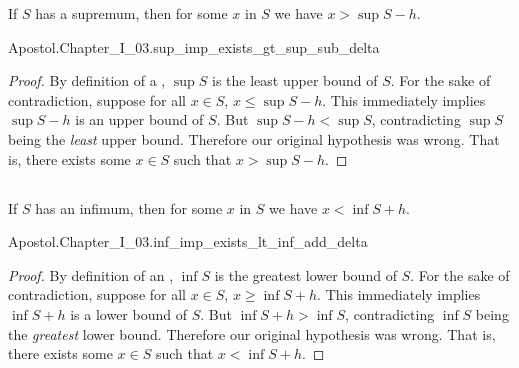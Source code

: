 \documentclass{report}
\begin{document}
  \begin{theorem}[I.32a]
    If $S$ has a supremum, then for some $x$ in $S$ we have $x > \sup{S} - h$.
  \end{theorem}

    {Apostol.Chapter\_I\_03.sup\_imp\_exists\_gt\_sup\_sub\_delta}

  \begin{proof}
    By definition of a , $\sup{S}$ is the least upper
      bound of $S$.
    For the sake of contradiction, suppose for all $x \in S$,
      $x \leq \sup{S} - h$.
    This immediately implies $\sup{S} - h$ is an upper bound of $S$.
    But $\sup{S} - h < \sup{S}$, contradicting $\sup{S}$ being the
      \textit{least} upper bound.
    Therefore our original hypothesis was wrong.
    That is, there exists some $x \in S$ such that $x > \sup{S} - h$.
  \end{proof}

\subsection{}%

  \begin{theorem}[I.32b]
    If $S$ has an infimum, then for some $x$ in $S$ we have $x < \inf{S} + h$.
  \end{theorem}

    {Apostol.Chapter\_I\_03.inf\_imp\_exists\_lt\_inf\_add\_delta}

  \begin{proof}
    By definition of an , $\inf{S}$ is the greatest lower
      bound of $S$.
    For the sake of contradiction, suppose for all $x \in S$,
      $x \geq \inf{S} + h$.
    This immediately implies $\inf{S} + h$ is a lower bound of $S$.
    But $\inf{S} + h > \inf{S}$, contradicting $\inf{S}$ being the
      \textit{greatest} lower bound.
    Therefore our original hypothesis was wrong.
    That is, there exists some $x \in S$ such that $x < \inf{S} + h$.
  \end{proof}

\section{}%
\end{document}
